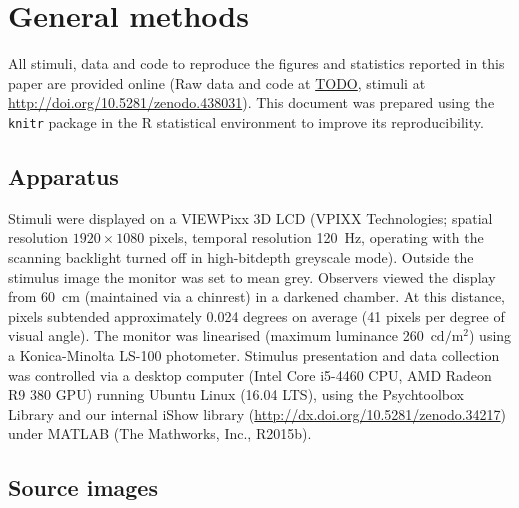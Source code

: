 \documentclass[doc, 11pt,a4paper,natbib]{apa6}\usepackage[]{graphicx}\usepackage[]{color}
\begin{document}
\section{General methods}



All stimuli, data and code to reproduce the figures and statistics reported in this paper are provided online (Raw data and code at \url{TODO}, stimuli at \url{http://doi.org/10.5281/zenodo.438031}).
This document was prepared using the \texttt{knitr} package \citep{xie_knitr_2013, xie_dynamic_2015} in the R statistical environment \citep{r_core_development_team_r:_2016,wickham_dplyr:_2016,wickham_ggplot2_2009,wickham_splitapplycombine_2011, auguie_gridextra:_2016, arnold_ggthemes:_2016} to improve its reproducibility.


\subsection{Apparatus}

Stimuli were displayed on a VIEWPixx 3D LCD (VPIXX Technologies; spatial resolution $1920 \times 1080$ pixels, temporal resolution 120~Hz, operating with the scanning backlight turned off in high-bitdepth greyscale mode).
Outside the stimulus image the monitor was set to mean grey.
Observers viewed the display from 60~cm (maintained via a chinrest) in a darkened chamber.
At this distance, pixels subtended approximately 0.024 degrees on average (41 pixels per degree of visual angle).
The monitor was linearised (maximum luminance 260~$\mathrm{cd}/ \mathrm{m}^2$) using a Konica-Minolta LS-100 photometer.
Stimulus presentation and data collection was controlled via a desktop computer (Intel Core i5-4460 CPU, AMD Radeon R9 380 GPU) running Ubuntu Linux (16.04 LTS), using the Psychtoolbox Library \citep[][version 3.0.12]{pelli_videotoolbox_1997,kleiner_whats_2007,brainard_psychophysics_1997} and our internal iShow library (\url{http://dx.doi.org/10.5281/zenodo.34217}) under MATLAB (The Mathworks, Inc., R2015b).

\subsection{Source images}
\end{document}

